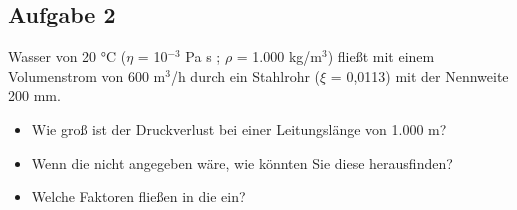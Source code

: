 \documentclass[a4paper,11pt]{article}
\newif\ifshowme
\begin{document}
\subsection*{Aufgabe 2}
Wasser von 20 °C ($\eta$ = 10$^{-3}$ Pa s ; $\rho$ = 1.000 kg/m$^3$) fließt mit einem Volumenstrom von 600 m$^3$/h durch ein Stahlrohr ($\xi$ = 0,0113) mit der Nennweite 200 mm. \par 
\begin{itemize}
\item Wie groß ist der Druckverlust bei einer Leitungslänge von 1.000 m?

\ifshowme
\antwort{
$\xi$ von Stahlrohr $\approx$ 0,0113 \par 
$\overline{v}$ ausrechnen:
\begin{align*}
\overline{v} = \frac{\dot{V}}{A} \rightarrow \overline{v} &= \frac{600~ \m^3/\text{h}}{\pi \cdot (0,1 \mskip3mu \text{m})^2} \\
 &\approx 19.098,6~\text{m/h} \\
 &\approx 5,3~\text{m/s}  \\ \\
\end{align*}
Wir nutzen die Formel für Druckabfall im Rohr:
\begin{align*}
\Delta p &= \xi \cdot \frac{l}{d} \cdot \frac{1}{2} \rho \cdot \overline{v}^2\\
\end{align*}
Werte einsetzen:
\begin{align*}
\Delta p &= 0,0113 \cdot \frac{1.000~\text{m}}{0,2~\text{m}} \cdot \frac{1}{2} \cdot 1.000 ~\text{kg/m}^3 \cdot (5,3~\text{m/s})^2 \\ &\approx 793.542~\text{Pa}\\
&\approx 7,94 \text{bar}
\end{align*}

}
\else
\fi

\item Wenn die  nicht angegeben wäre, wie könnten Sie diese herausfinden?

\ifshowme
\antwort{
Über zum Teil aufwendige Gleichungen (Colebrook, Nikuradse, etc.) oder aber über das Auslesen eines \textbf{Moody-Diagramms}.
}
\else
\fi

\item Welche Faktoren fließen in die  ein?


\ifshowme
\antwort{
Die \textbf{Rohrreibungszahl} ist Abhängig von:
\begin{itemize}
\item[$\triangleright$] relativer Rauhigkeit $e$ (Quotient aus Wandrauhigkeit und Rohrinnendurchmesser $k/d$) 
\item[$\triangleright$] Reynoldszahl
\end{itemize}
}
\else
\fi
\end{itemize}
\end{document}
